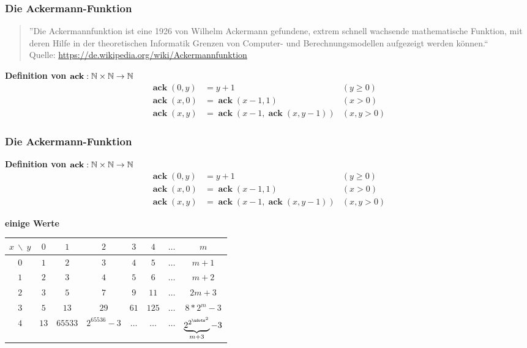 \documentclass{beamer}
\DeclareMathOperator{\ack}{\mathbf{ack}}
\begin{document}
\begin{frame} \frametitle{Die Ackermann-Funktion}
	\begin{quote} \small
		''Die Ackermannfunktion ist eine 1926 von Wilhelm Ackermann gefundene, extrem schnell wachsende mathematische Funktion, mit deren Hilfe in der theoretischen Informatik Grenzen von Computer- und Berechnungsmodellen aufgezeigt werden können.`` \\
		\upshape \tiny Quelle: \url{https://de.wikipedia.org/wiki/Ackermannfunktion}
	\end{quote}

	\textbf{Definition von  $\ack : \N \times \N \to \N$}
	\begin{align*}
		\ack(0,y) &= y + 1 &(y \ge 0) \\
		\ack(x,0) &= \ack(x-1,1) &(x > 0)\\
		\ack(x,y) &= \ack(x-1,\ack(x,y-1)) &(x,y > 0)
	\end{align*}
\end{frame}

\begin{frame} \frametitle{Die Ackermann-Funktion}
\textbf{Definition von  $\ack : \N \times \N \to \N$}
	\begin{align*}
	\ack(0,y) &= y + 1 &(y \ge 0) \\
	\ack(x,0) &= \ack(x-1,1) &(x > 0)\\
	\ack(x,y) &= \ack(x-1,\ack(x,y-1)) &(x,y > 0)
	\end{align*}
	
	\textbf{einige Werte}
	
	\begin{small}
		\begin{tabular}{c||ccccccc}
			$x \ \backslash \ y$ & $0$ & $1$ & $2$ & $3$ & $4$ & $\dots$ & $m$ \\ \hline\hline
			$0$ & $1$ & $2$ & $3$ & $4$ & $5$ & $\dots$ & $m+1$ \\
			$1$ & $2$ & $3$ & $4$ & $5$ & $6$ & $\dots$ & $m+2$ \\
			$2$ & $3$ & $5$ & $7$ & $9$ & $11$ & $\dots$ & $2m+3$ \\
			$3$ & $5$ & $13$ & $29$ & $61$ & $125$ & $\dots$ & $8*2^m-3$ \\
			$4$ & $13$ & $65533$ & $2^{65536} -3$ & $\dots$ & $\dots$ & $\dots$ & $\underbrace{2^{2^{{\udots}^2}} }_{m+3}- 3$ 
		\end{tabular}
	\end{small}	
\end{frame}
\end{document}
